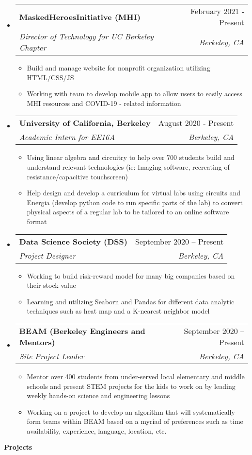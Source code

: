 \documentclass[letterpaper,8pt]{article}[leftmargin=*]
\makeatletter
\renewcommand{\section}[2]{\vspace{2pt}
  \colorbox{secondary}{\color{white}\raggedbottom\normalsize\textbf{{#1}{\hspace{7pt}#2}}}
}
\newcommand{\resumeEntryStart}{\begin{itemize}[leftmargin=2.5mm]}
\newcommand{\resumeEntryEnd}{\end{itemize}\vspace{0pt}}
\newcommand{\resumeItemListStart}{\begin{itemize}[leftmargin=4.5mm]}
\newcommand{\resumeItemListEnd}{\end{itemize} \vspace{0pt}}
\newcommand{\resumeItem}[1]{
  \item\small{
    {#1 \vspace{-3pt}}
  }
}
\newcommand{\resumeEntryTSDL}[4]{
  \vspace{0pt}\item[]
    \begin{tabularx}{0.97\textwidth}{X@{\hspace{60pt}}r}
      \textbf{\color{primary}#1} & {\firabook\color{accent}\small#2} \\
      \textit{\color{accent}\small#3} & \textit{\color{accent}\small#4} \\
    \end{tabularx}\vspace{-8pt}
}
\makeatother
\begin{document}
  \resumeEntryStart
    \resumeEntryTSDL
      {MaskedHeroesInitiative (MHI)}{February 2021 - Present}
      {Director of Technology for UC Berkeley Chapter}{Berkeley, CA}
    \resumeItemListStart
      \resumeItem {Build and manage website for nonprofit organization utilizing HTML/CSS/JS}
      \resumeItem {Working with team to develop mobile app to allow users to easily access MHI resources and COVID-19 - related information}
    \resumeItemListEnd
  \resumeEntryEnd

  \resumeEntryStart
    \resumeEntryTSDL
      {University of California, Berkeley}{August 2020 - Present}
      {Academic Intern for EE16A}{Berkeley, CA}
    \resumeItemListStart
        \resumeItem {Using linear algebra and circuitry to help over 700 students build and understand relevant technologies (ie: Imaging software, recreating of resistance/capacitive touchscreen)}
        \resumeItem {Help design and develop a curriculum for virtual labs using circuits and Energia (develop python code to run specific parts of the lab) to convert physical aspects of a regular lab to be tailored to an online software format}
    \resumeItemListEnd
  \resumeEntryEnd

  \resumeEntryStart
    \resumeEntryTSDL
      {Data Science Society (DSS)}{September 2020 -- Present}
      {Project Designer}{Berkeley, CA}
    \resumeItemListStart
      \resumeItem {Working to build risk-reward model for many big companies based on their stock value}
      \resumeItem {Learning and utilizing Seaborn and Pandas for different data analytic techniques such as heat map and a K-nearest neighbor model}
    \resumeItemListEnd
  \resumeEntryEnd
  
  \resumeEntryStart
    \resumeEntryTSDL
      {BEAM (Berkeley Engineers and Mentors)}{September 2020 -- Present}
      {Site Project Leader}{Berkeley, CA}
    \resumeItemListStart
      \resumeItem {Mentor over 400 students from under-served local elementary and middle schools and present STEM projects for the kids to work on by leading weekly hands-on science and engineering lessons}
      \resumeItem {Working on a project to develop an algorithm that will systematically form teams within BEAM based on a myriad of preferences such as time availability, experience, language, location, etc.}
    \resumeItemListEnd
  \resumeEntryEnd



\section{\faFlask}{Projects}
\end{document}
